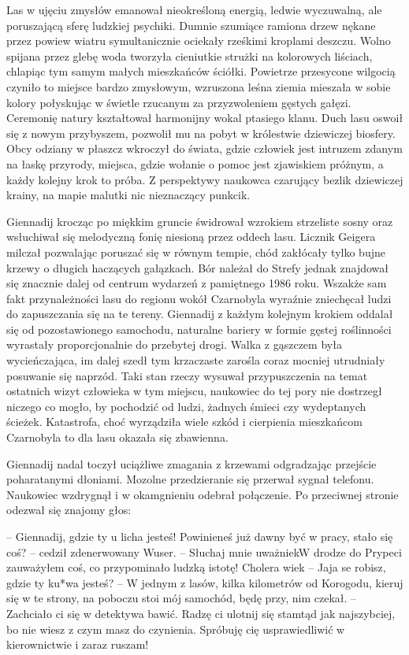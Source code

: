 \documentclass[../MAIN.tex]{subfiles}
\begin{document}
% 
Las w ujęciu zmysłów emanował nieokreśloną energią, ledwie wyczuwalną, ale poruszającą sferę ludzkiej psychiki. Dumnie szumiące ramiona drzew nękane przez powiew wiatru symultanicznie ociekały rześkimi kroplami deszczu. Wolno spijana przez glebę woda tworzyła cieniutkie strużki na kolorowych liściach, chlapiąc tym samym małych mieszkańców ściółki. Powietrze przesycone wilgocią czyniło to miejsce bardzo zmysłowym, wzruszona leśna ziemia mieszała w sobie kolory połyskując w świetle rzucanym za przyzwoleniem gęstych gałęzi. Ceremonię natury kształtował harmonijny wokal ptasiego klanu. Duch lasu oswoił się z nowym przybyszem, pozwolił mu na pobyt w królestwie dziewiczej biosfery. Obcy odziany w płaszcz wkroczył do świata, gdzie człowiek jest intruzem zdanym na łaskę przyrody, miejsca, gdzie wołanie o pomoc jest zjawiskiem próżnym, a każdy kolejny krok to próba. Z perspektywy naukowca czarujący bezlik dziewiczej krainy, na mapie malutki nic nieznaczący punkcik. 

Giennadij krocząc po miękkim gruncie świdrował wzrokiem strzeliste sosny oraz wsłuchiwał się melodyczną fonię niesioną przez oddech lasu. Licznik Geigera milczał pozwalając poruszać się w równym tempie, chód zakłócały tylko bujne krzewy o długich haczących gałązkach. Bór należał do Strefy jednak znajdował się znacznie dalej od centrum wydarzeń z pamiętnego 1986 roku. Wszakże sam fakt przynależności lasu do regionu wokół Czarnobyla wyraźnie zniechęcał ludzi do zapuszczania się na te tereny. Giennadij z każdym kolejnym krokiem oddalał się od pozostawionego samochodu, naturalne bariery w formie gęstej roślinności wyrastały proporcjonalnie do przebytej drogi. Walka z gąszczem była wycieńczająca, im dalej szedł tym krzaczaste zarośla coraz mocniej utrudniały posuwanie się naprzód. Taki stan rzeczy wysuwał przypuszczenia na temat ostatnich wizyt człowieka w tym miejscu, naukowiec do tej pory nie dostrzegł niczego co mogło, by pochodzić od ludzi, żadnych śmieci czy wydeptanych ścieżek. Katastrofa, choć wyrządziła wiele szkód i cierpienia mieszkańcom Czarnobyla to dla lasu okazała się zbawienna. 

Giennadij nadal toczył uciążliwe zmagania z krzewami odgradzając przejście poharatanymi dłoniami. Mozolne przedzieranie się przerwał sygnał telefonu. Naukowiec wzdrygnął i w okamgnieniu odebrał połączenie. Po przeciwnej stronie odezwał się znajomy głos: 

-- Giennadij, gdzie ty u licha jesteś! Powinieneś już dawny być w pracy, stało się coś? -- cedził zdenerwowany Wuser. 
-- Słuchaj mnie uważnie\3kW drodze do Prypeci zauważyłem coś, co przypominało ludzką istotę! Cholera wie\3k 
-- Jaja se robisz, gdzie ty ku*wa jesteś? 
-- W jednym z lasów, kilka kilometrów od Korogodu, kieruj się w te strony, na poboczu stoi mój samochód, będę przy, nim czekał. 
-- Zachciało ci się w detektywa bawić. Radzę ci ulotnij się stamtąd jak najszybciej, bo nie wiesz z czym masz do czynienia. Spróbuję cię usprawiedliwić w kierownictwie i zaraz ruszam! 
\end{document}

